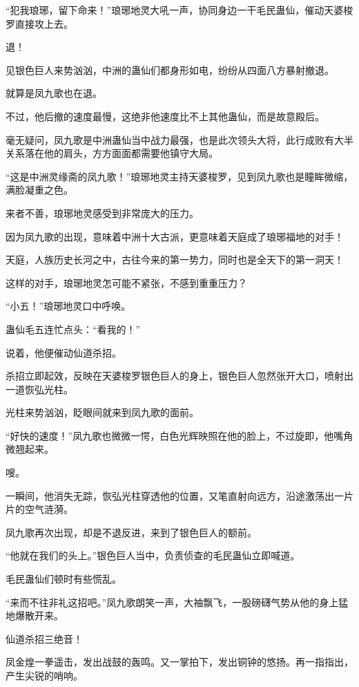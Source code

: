 
\begin{this_body}

“犯我琅琊，留下命来！”琅琊地灵大吼一声，协同身边一干毛民蛊仙，催动天婆梭罗直接攻上去。

退！

见银色巨人来势汹汹，中洲的蛊仙们都身形如电，纷纷从四面八方暴射撤退。

就算是凤九歌也在退。

不过，他后撤的速度最慢，这绝非他速度比不上其他蛊仙，而是故意殿后。

毫无疑问，凤九歌是中洲蛊仙当中战力最强，也是此次领头大将，此行成败有大半关系落在他的肩头，方方面面都需要他镇守大局。

“这是中洲灵缘斋的凤九歌！”琅琊地灵主持天婆梭罗，见到凤九歌也是瞳眸微缩，满脸凝重之色。

来者不善，琅琊地灵感受到非常庞大的压力。

因为凤九歌的出现，意味着中洲十大古派，更意味着天庭成了琅琊福地的对手！

天庭，人族历史长河之中，古往今来的第一势力，同时也是全天下的第一洞天！

这样的对手，琅琊地灵怎可能不紧张，不感到重重压力？

“小五！”琅琊地灵口中呼唤。

蛊仙毛五连忙点头：“看我的！”

说着，他便催动仙道杀招。

杀招立即起效，反映在天婆梭罗银色巨人的身上，银色巨人忽然张开大口，喷射出一道恢弘光柱。

光柱来势汹汹，眨眼间就来到凤九歌的面前。

“好快的速度！”凤九歌也微微一愕，白色光辉映照在他的脸上，不过旋即，他嘴角微翘起来。

嗖。

一瞬间，他消失无踪，恢弘光柱穿透他的位置，又笔直射向远方，沿途激荡出一片片的空气涟漪。

凤九歌再次出现，却是不退反进，来到了银色巨人的额前。

“他就在我们的头上。”银色巨人当中，负责侦查的毛民蛊仙立即喊道。

毛民蛊仙们顿时有些慌乱。

“来而不往非礼这招吧。”凤九歌朗笑一声，大袖飘飞，一股磅礴气势从他的身上猛地爆散开来。

仙道杀招三绝音！

凤金煌一拳遥击，发出战鼓的轰鸣。又一掌拍下，发出铜钟的悠扬。再一指指出，产生尖锐的哨响。


\end{this_body}
